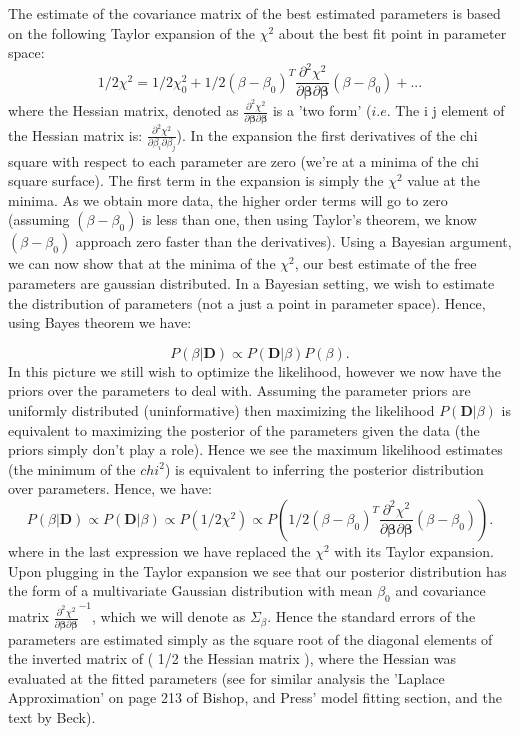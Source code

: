 The estimate of the covariance matrix of the best estimated parameters is based on the following Taylor expansion of the $\chi^2$ about the best fit point in parameter space:
\begin{equation}
 1/2\chi^2 = 1/2\chi_0^2 + 1/2(\beta-\beta_0)^T \frac{\partial^2{\chi^2}}{\partial{\mathbf{\beta}}\partial{\mathbf{\beta}}}(\beta-\beta_0) + ...
 \end{equation} 
 where the Hessian matrix, denoted as $\frac{\partial^2{\chi^2}}{\partial{\mathbf{\beta}}\partial{\mathbf{\beta}}}$ is a 'two form' ($\textit{i.e.}$ The i j element of the Hessian matrix is: $\frac{\partial^2{\chi^2}}{\partial{\beta_i}\partial{\beta_j}}$).  In the expansion the first derivatives of the chi square with respect to each parameter are zero (we're at a minima of the chi square surface).  The first term in the expansion is simply the $\chi^2$ value at the minima.  As we obtain more data, the higher order terms will go to zero (assuming $(\beta-\beta_0)$ is less than one, then using Taylor's theorem, we know $(\beta-\beta_0)$ approach zero faster than the derivatives).  Using a Bayesian argument, we can now show that at the minima of the $\chi^2$, our best estimate of the free parameters are gaussian distributed.  In a Bayesian setting, we wish to estimate the distribution of parameters (not a just a point in parameter space).  Hence, using Bayes theorem we have:


 \begin{equation}
 P(\beta|\mathbf{D}) \propto P(\mathbf{D}| \beta)P(\beta) .
 \end{equation}
 In this picture we still wish to optimize the likelihood, however we now have the priors over the parameters to deal with.  Assuming the parameter priors are uniformly distributed (uninformative) then maximizing the likelihood $P(\mathbf{D}| \beta)$ is equivalent to maximizing the posterior of the parameters given the data (the priors simply don't play a role).  Hence we see the maximum likelihood estimates (the minimum of the $chi^2$) is equivalent to inferring the posterior distribution over parameters.  Hence, we have:
 \begin{equation}
 P(\beta|\mathbf{D}) \propto P(\mathbf{D}| \beta) \propto P(1/2\chi^2) \propto P(1/2(\beta-\beta_0)^T \frac{\partial^2{\chi^2}}{\partial{\mathbf{\beta}}\partial{\mathbf{\beta}}}(\beta-\beta_0)) .
 \end{equation}
 where in the last expression we have replaced the $\chi^2$ with its Taylor expansion.  Upon plugging in the Taylor expansion we see that our posterior distribution has the form of a multivariate Gaussian distribution with mean $\beta_0$ and covariance matrix $\frac{\partial^2{\chi^2}}{\partial{\mathbf{\beta}}\partial{\mathbf{\beta}}}^{-1}$, which we will denote as $\Sigma_{\beta}$.  Hence the standard errors of the parameters are estimated simply as the square root of the diagonal elements of the inverted matrix of ( 1/2 the Hessian matrix ), where the Hessian was evaluated at the fitted parameters (see for similar analysis the 'Laplace Approximation' on page 213 of Bishop\cite{bishop}, and Press' model fitting section\cite{press_etal:1996}, and the text by Beck\cite{beck}).
 
